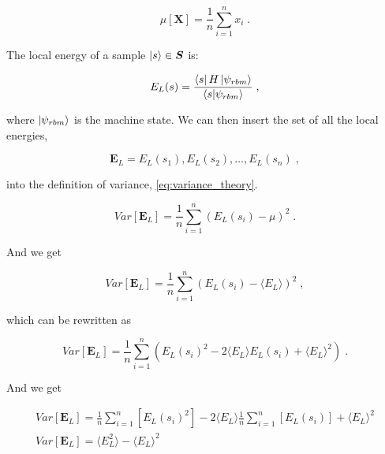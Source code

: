 \begin{equation}
  \mu[\boldsymbol{X}] = \frac{1}{n} \sum_{i=1}^n x_i \; .
  \label{eq:mean_theory}
\end{equation}

The local energy of a sample $\ket{s} \in \boldsymbol{S}$ is:

\begin{equation}
  E_L(s) = \frac{\bra{s} H \ket{\psi_{rbm}}}{\braket{s}{\psi_{rbm}}} \; ,
  \label{eq:local_energy_variance}
\end{equation}

where $\ket{\psi_{rbm}}$ is the machine state. We can then insert the set of all the local energies,

\begin{equation}
  \boldsymbol{E}_L = {E_L(s_1), E_L(s_2), \dots, E_L(s_n)} \; ,
  \label{eq:local_energies_set_variance}
\end{equation}

into the definition of variance, \ref{eq:variance_theory}.

\begin{equation}
  Var[\boldsymbol{E}_L] = \frac{1}{n} \sum_{i=1}^n \left (E_L(s_i) - \mu\right)^2 \; .
  \label{eq:variance_local_energy}
\end{equation}

And we get

\begin{equation}
  Var[\boldsymbol{E}_L] = \frac{1}{n} \sum_{i=1}^n \left (
    E_L(s_i)
    - \langle E_L\rangle
  \right )^2 \; ,
  \label{eq:variance_local_energy_2}
\end{equation}

which can be rewritten as

\begin{equation}
  Var[\boldsymbol{E}_L] = \frac{1}{n} \sum_{i=1}^n \left (E_L(s_i)^2 - 2 \langle E_L\rangle E_L(s_i) + \langle E_L\rangle^2 \right ) \; .
  \label{eq:variance_local_energy_3}
\end{equation}

And we get

\begin{gather}
  Var[\boldsymbol{E}_L] = 
   \frac{1}{n} \sum_{i=1}^n [E_L(s_i)^2] 
  -2\langle E_L\rangle \frac{1}{n} \sum_{i=1}^n[E_L(s_i)] 
  + \langle E_L\rangle^2  \\
   Var[\boldsymbol{E}_L] =
   \langle E_L^2 \rangle   
  -\langle E_L\rangle^2
  \label{eq:variance_local_energy_4}
\end{gather}


